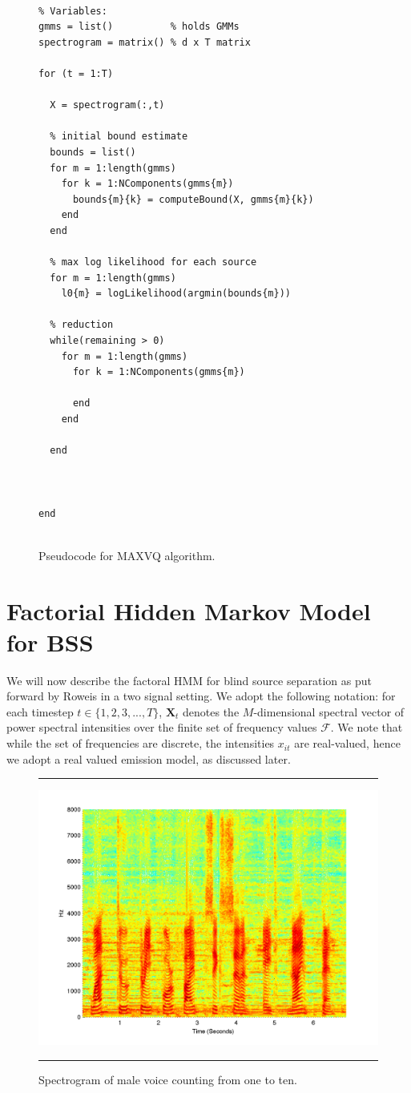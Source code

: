 \documentclass[11pt, oneside, a4paper]{report}
\begin{document}
\begin{figure}[!htpb]
  \begin{lstlisting}[frame=single]
    
% Variables:
gmms = list()          % holds GMMs 
spectrogram = matrix() % d x T matrix

for (t = 1:T)
  
  X = spectrogram(:,t)

  % initial bound estimate
  bounds = list()
  for m = 1:length(gmms)
    for k = 1:NComponents(gmms{m})
      bounds{m}{k} = computeBound(X, gmms{m}{k})
    end
  end

  % max log likelihood for each source
  for m = 1:length(gmms)
    l0{m} = logLikelihood(argmin(bounds{m}))
  
  % reduction
  while(remaining > 0)
    for m = 1:length(gmms)
      for k = 1:NComponents(gmms{m})
        
      end
    end
  
  end
 


end
    
  \end{lstlisting}
  \caption{Pseudocode for MAXVQ algorithm.}
  \label{maxvq_pseudo}
\end{figure}



\section{Factorial Hidden Markov Model for BSS}\label{fhmm}

We will now describe the factoral HMM for blind source separation as
put forward by Roweis in a two signal setting. We adopt the following
notation: for each timestep $t \in \{1,2,3,...,T\}$, $\mathbf{X}_t$
denotes the $M$-dimensional spectral vector of power spectral
intensities over the finite set of frequency values $\mathcal{F}$. We
note that while the set of frequencies are discrete, the intensities
$x_{it}$ are real-valued, hence we adopt a real valued emission
model, as discussed later. 


\begin{figure}
  \centering
  \hrule
  \includegraphics[width = .9\textwidth]{Figures/spectrogram_count}
  \hrule
  \caption{Spectrogram of male voice counting from one to ten.}
\end{figure}
\end{document}
